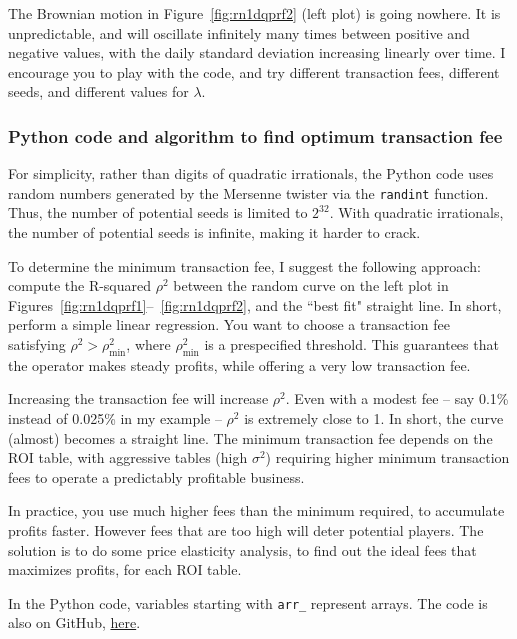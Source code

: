 \documentclass[oneside,10pt]{book}
\begin{document}
The Brownian motion in Figure~\ref{fig:rn1dqprf2} (left plot) is going nowhere. It is unpredictable, and will oscillate infinitely
 many times between positive and negative values, with the daily standard deviation increasing linearly over time. I encourage you
 to play with the code, and try different transaction fees, different seeds, and different values for $\lambda$.




\subsubsection{Python code and algorithm to find optimum transaction fee}

For simplicity, rather than digits of quadratic irrationals, the Python code uses random numbers generated by the \textcolor{index}{Mersenne twister} via the \texttt{randint} function. Thus, the number of potential seeds is limited to $2^{32}$. With quadratic irrationals, the number of potential seeds is infinite, making it harder to crack.

To determine the minimum transaction fee, I suggest the following approach: compute the 
\textcolor{index}{R-squared} $\rho^2$  between the random curve 
 on the left plot in Figures~\ref{fig:rn1dqprf1}--~\ref{fig:rn1dqprf2}, and the ``best fit" straight line. In short, perform a simple
 linear regression. You want to choose a transaction fee satisfying 
$\rho^2>\rho^2_{\text{min}}$,
 where 
$\rho^2_{\text{min}}$ is a prespecified threshold. This guarantees that the operator makes steady profits, while offering a very low transaction fee. 

Increasing the transaction fee will increase $\rho^2$. Even with a modest fee -- say 0.1\% instead of 0.025\% in my example --
 $\rho^2$ is extremely close to 1. In short, the curve (almost) becomes a straight line. The minimum transaction fee 
 depends on the ROI table, with aggressive tables (high $\sigma^2$) requiring higher minimum transaction fees to operate a 
predictably profitable business. 

In practice, you use much higher fees than the minimum required, to accumulate profits faster. However fees that are too high 
 will deter potential players. The solution is to do some price elasticity analysis, to find out the ideal fees that maximizes profits,
 for each ROI table.
 

In the Python code, variables starting with \texttt{arr\_} represent arrays.  The code is also on GitHub, \href{https://github.com/VincentGranville/Stochastic-Processes/blob/master/lottery_profits.py}{here}. \vspace{1ex}
\end{document}
